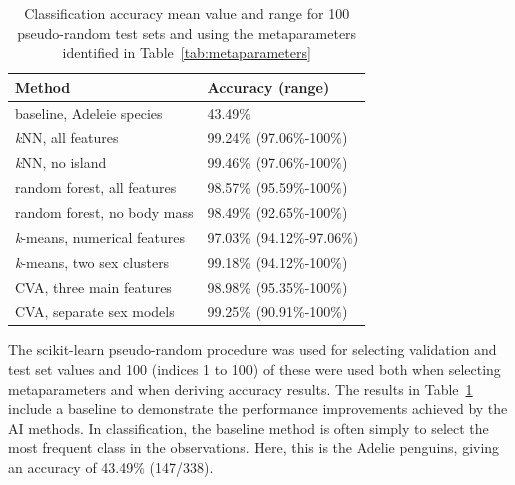 \documentclass[a4paper, 11pt]{article}
\begin{document}
\begin{table} %
  \small
  \begin{center}
  \vspace{-2\baselineskip} %
  \setlength{\abovecaptionskip}{5pt}
  \setlength{\belowcaptionskip}{5pt}
  \fontsize{10}{10}\selectfont %
  \begin{tabular}{l|l}
  \textbf{Method} & \textbf{Accuracy (range)}\\
  \hline
  baseline, Adeleie species & 43.49\% \\
  \hline
  \textit{k}NN, all features & 99.24\% (97.06\%-100\%)\\
  \textit{k}NN, no island &	99.46\% (97.06\%-100\%)\\
  \hline
  random forest, all features	& 98.57\% (95.59\%-100\%)\\
  random forest, no body mass & 98.49\% (92.65\%-100\%)\\
  \hline
  \textit{k}-means, numerical features & 97.03\% (94.12\%-97.06\%)\\
  \textit{k}-means, two sex clusters  & 99.18\% (94.12\%-100\%)\\
  \hline
  CVA, three main features & 98.98\% (95.35\%-100\%)\\
  CVA, separate sex models & 99.25\% (90.91\%-100\%)\\
  \hline
  \end{tabular}
  \vspace{-2\baselineskip} %
  \end{center} 
  \caption{\centering\linespread{0.8}\selectfont Classification accuracy mean value and range for 100 pseudo-random test sets 
  and using the metaparameters identified in Table~\ref{tab:metaparameters}}
  \vspace{-1\baselineskip} %
  \label{tab:results}
\end{table} 

The scikit-learn 
pseudo-random procedure was used for selecting validation and test set values and 100 (indices 1 to 100) of these were used 
both when selecting metaparameters and when deriving accuracy results.
The results in Table~\ref{tab:results} include a baseline to demonstrate the 
performance improvements achieved by the AI methods. In classification, the
baseline method is often simply to select the most frequent class in the observations. Here, 
this is the Adelie penguins, giving an accuracy of 43.49\% (147/338). 
\end{document}
